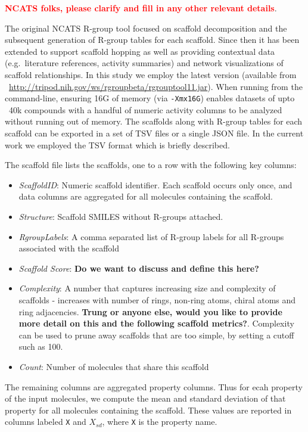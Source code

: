 \documentclass[journal=jacsat,manuscript=article]{achemso}
\newcommand*\eg{e.g.~}
\begin{document}
\textbf{\textcolor{red}{NCATS folks, please clarify and fill in any other relevant details}}.

The original NCATS R-group tool focused on scaffold decomposition and
the subsequent generation of R-group tables for each scaffold. Since
then it has been extended to support scaffold hopping as well as
providing contextual data (\eg literature references, activity
summaries) and network visualizations of scaffold relationships. In
this study we employ the latest version (available from
~\url{http://tripod.nih.gov/ws/rgroupbeta/rgrouptool11.jar}). When
running from the command-line, ensuring 16G of memory (via
\texttt{-Xmx16G}) enables datasets of upto ~40k compounds with a
handful of numeric activity columns to be analyzed without running out
of memory. The scaffolds along with R-group tables for each scaffold
can be exported in a set of TSV files or a single JSON file. In the
current work we employed the TSV format which is briefly described.

The scaffold file lists the scaffolds, one to a row with the following
key columns:
\begin{itemize}
\item {\it ScaffoldID}: Numeric scaffold identifier. Each scaffold occurs only once, and data columns are aggregated for all molecules containing the scaffold.
\item {\it Structure}: Scaffold SMILES without R-groups attached. 
\item{\it RgroupLabels}: A comma separated list of R-group labels for
  all R-groups associated with the scaffold
\item {\it Scaffold Score}: \textbf{Do we want to discuss and define this here?}
\item {\it Complexity}: A number that captures increasing size and complexity of scaffolds - increases with number of rings, non-ring atoms, chiral atoms and ring adjacencies. \textbf{Trung or anyone else, would you like to provide more detail on this and the following scaffold metrics?}. Complexity can be used to prune away scaffolds that are too simple, by setting a cutoff such as 100.  
\item {\it Count}: Number of molecules that share this scaffold
\end{itemize}
The remaining columns are aggregated property columns. Thus for ecah
property of the input molecules, we compute the mean and standard
deviation of that property for all molecules containing the
scaffold. These values are reported in columns labeled \texttt{X} and
\texttt{$X_{sd}$}, where \texttt{X} is the property name.
\end{document}
